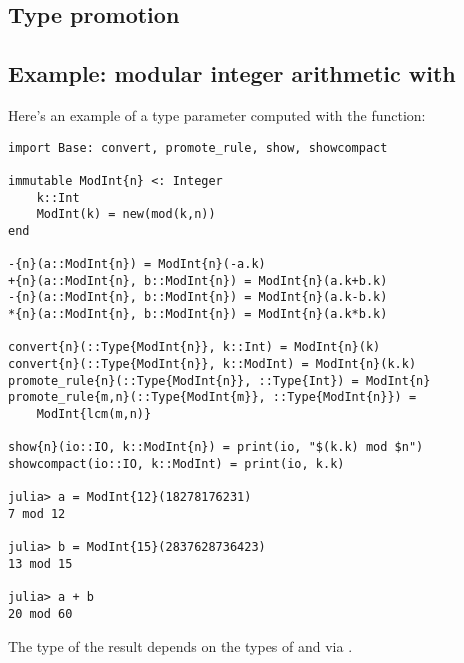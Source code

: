 \subsection{Type promotion}

\subsection{Example: modular integer arithmetic with }

Here's an example of a type parameter computed with the  function:

\begin{verbatim}
import Base: convert, promote_rule, show, showcompact

immutable ModInt{n} <: Integer
    k::Int
    ModInt(k) = new(mod(k,n))
end

-{n}(a::ModInt{n}) = ModInt{n}(-a.k)
+{n}(a::ModInt{n}, b::ModInt{n}) = ModInt{n}(a.k+b.k)
-{n}(a::ModInt{n}, b::ModInt{n}) = ModInt{n}(a.k-b.k)
*{n}(a::ModInt{n}, b::ModInt{n}) = ModInt{n}(a.k*b.k)

convert{n}(::Type{ModInt{n}}, k::Int) = ModInt{n}(k)
convert{n}(::Type{ModInt{n}}, k::ModInt) = ModInt{n}(k.k)
promote_rule{n}(::Type{ModInt{n}}, ::Type{Int}) = ModInt{n}
promote_rule{m,n}(::Type{ModInt{m}}, ::Type{ModInt{n}}) =
    ModInt{lcm(m,n)}

show{n}(io::IO, k::ModInt{n}) = print(io, "$(k.k) mod $n")
showcompact(io::IO, k::ModInt) = print(io, k.k)

julia> a = ModInt{12}(18278176231)
7 mod 12

julia> b = ModInt{15}(2837628736423)
13 mod 15

julia> a + b
20 mod 60
\end{verbatim}

The type of the result  depends on the types of  and  via .

